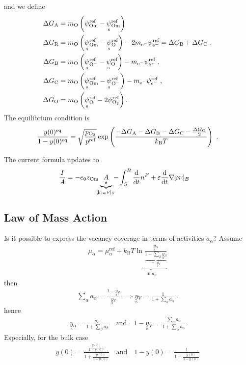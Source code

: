 \documentclass{article}
\numberwithin{equation}{section}
\newcommand{\us}[1]{\underset{\textrm{s}}{#1}{}}
\def\kB{k_\mathrm{B}}
\def\Ox{\mathrm{O}}
\newcommand{\Omin}{{\ce{O-}}}
\def\Om{\mathrm{Om}}
\newcommand{\OO}{{\ce{O2}}}
\newcommand{\dd}{{\mathrm{d}}}
\def\eM{\mathrm{e^-}}
\newcommand{\ysV}{\us y_{\textrm{V}}}
\def\y0{y(0)}
\def\DGA{\Delta G_\textrm{A}  }
\def\DGB{\Delta G_\textrm{B}  }
\def\DGC{\Delta G_\textrm{C}  }
\def\DGR{\Delta G_\textrm{R}  }
\def\DGO{\Delta G_\textrm{O}  }
\def\eq{\textrm{eq}}
\def\REF{\textrm{ref}}
\begin{document}
and we define
\begin{subequations}
\begin{align}
\DGA
&=
m_\Ox
\left(
	\psi_{\textrm{Om}}^\REF
	-
	\us \psi_{\textrm{Om}}^\REF
\right)
\\
\DGR
&= 
m_\Ox
\left(
	\us \psi_\Om^\REF
	-
	\us \psi_\Ox^\REF
\right)
-
2m_\eM \psi_\eM^\REF= \DGB + \DGC~,
\\\DGB
&= 
m_\Ox
\left(
	\us \psi_\Omin^\REF
	-
	\us \psi_\Ox^\REF
\right)
-
m_\eM \psi_\eM^\REF~,
\\
\DGC
&= 
m_\Ox
\left(
	\us \psi_\Om^\REF
	-
	\us \psi_\Omin^\REF
\right)
-
m_\eM \psi_\eM^\REF~,
\\
\DGO
&= 
m_\Ox
\left(
	\us \psi_{\Ox}^\REF
	-
	2 \psi_{\OO}^\REF
\right).
\end{align}
\end{subequations}
The equilibrium condition is
\begin{subequations}
\begin{align}
    \frac{\y0^\eq}{1-\y0^\eq} = \sqrt{\frac{p_\OO}{p^\REF}} \exp
\left(
	\frac{-\DGA - \DGB - \DGC - \frac{\DGO}{2}}{\kB T}
\right)~.
\end{align}
\end{subequations}

The current formula updates to
\begin{align}
    \frac{I}{A} &= - e_0  z_\Om \underbrace{\us A}_{\mathclap{\mathbf{j}_\Om\nu|_S}}
                     - \int_S^B \frac{\dd}{\dd t} n^F
                     +\varepsilon\frac{\dd}{\dd t}\nabla\varphi\nu|_B 
    \label{}
\end{align}
\subsection{Law of Mass Action}
Is it possible to express the vacancy coverage in terms of activities $a_\alpha$?
Assume
\begin{align}
    \mu_\alpha = \mu_\alpha^\REF + \kB T\underbrace{
      \ln \frac{\us y_\alpha}
               {\underbrace{1-\sum_\beta \us y_\beta}_{=:\ysV}}
    }_{\ln a_\alpha}
    \label{}
\end{align}
then
\begin{align}
    \sum_\alpha a_\alpha = \frac{1-\ysV}{\ysV} \implies \ysV = \frac{1}{1 + \sum_\alpha a_\alpha}~.
    \label{}
\end{align}
hence
\begin{align}
    \us y_\alpha = \frac{a_\alpha}{1+ \sum_\beta a_\beta}\quad\mbox{and}\quad 1-\ysV = \frac{\sum_\alpha a_\alpha}{1+ \sum_\alpha a_\alpha}
    \label{}
\end{align}
Especially, for the bulk case
\begin{align}
    y(0) = \frac{\frac{y(0)}{1-y(0)}}{1+\frac{y(0)}{1-y(0)}} \quad\mbox{and}\quad    1-y(0) = \frac{1}{1+\frac{y(0)}{1-y(0)}}
    \label{}
    \end{align}
\end{document}
